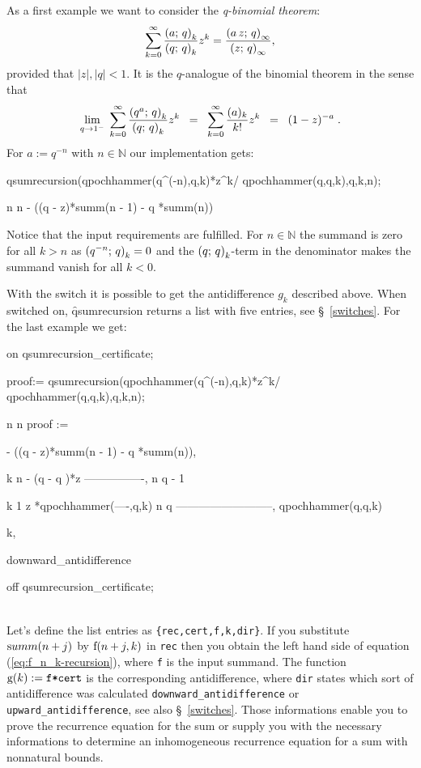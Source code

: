 As a first example we want to consider the {\sl q-binomial theorem}:
\[
	\sum_{k=0}^\infty{\frac{\left(a;\,q\right)_{k}}{\left(q;\,q\right)_{k}}z^k} =
	\frac{\left(a\,z;\,q\right)_{\infty}}{\left(z;\,q\right)_{\infty}},
\]
provided that $|z|,|q|<1$.
It is the $q$-analogue of the binomial theorem in the sense that
\[
	\lim_{q\rightarrow{}1^-}\;{\sum_{k=0}^\infty{
	\frac{\left(q^a;\,q\right)_{k}}{\left(q;\,q\right)_{k}}z^k}} \;\;=\;\;
	\sum_{k=0}^\infty{\frac{(a)_k}{k!}z^k} \;\;=\;\; (1-z)^{-a}\;.
\]
For $a:=q^{-n}$ with $n\in\mathbb{N}$ our implementation gets:
\begin{redoutput}
\redprompt qsumrecursion(qpochhammer(q^(-n),q,k)*z^k/
   qpochhammer(q,q,k),q,k,n);

      n                     n
 - ((q  - z)*summ(n - 1) - q *summ(n))
\end{redoutput}
%
Notice that the input requirements are fulfilled. For $n\in\mathbb{N}$ the
summand is zero for all $k>n$ as $\left(q^{-n};\,q\right)_{k}=0$ and
the $\left(q;\,q\right)_{k}$-term in the denominator makes the summand
vanish for all $k<0$.

With the switch  it is possible
to get the antidifference $g_k$ described above. When switched
on, \f{qsumrecursion} returns a list with five entries,
see \S~\ref{switches}. For the
last example we get:

\begin{redoutput}
\redprompt on qsumrecursion_certificate;

\redprompt proof:= qsumrecursion(qpochhammer(q^(-n),q,k)*z^k/
    qpochhammer(q,q,k),q,k,n);

                n                     n
proof := { - ((q  - z)*summ(n - 1) - q *summ(n)),

                k    n
            - (q  - q )*z
          ----------------,
                n
               q  - 1

            k              1
           z *qpochhammer(----,q,k)
                            n
                           q
          --------------------------,
              qpochhammer(q,q,k)

          k,

          downward_antidifference}

\redprompt off qsumrecursion_certificate;
\end{redoutput}
%
\\[-2.5ex]\noindent{}
Let's define the list entries as \texttt{\{rec,cert,f,k,dir\}}. If you
substitute ${\mathrm summ}(n+j)$ by ${\mathrm f}(n+j,k)$ in \texttt{rec} then
you obtain the left hand side of equation (\ref{eq:f_n_k-recursion}),
where \texttt{f} is the input summand. The function
${\mathrm g}(k):=\text{\texttt{f*cert}}$ is the corresponding
antidifference, where \texttt{dir} states which sort of antidifference
was calculated \texttt{downward\_antidifference} or
\texttt{upward\_antidifference}, see also \S~\ref{switches}.
Those informations enable you to prove the recurrence equation for
the sum or supply you with the necessary informations to determine
an inhomogeneous recurrence equation for a sum with nonnatural bounds.

